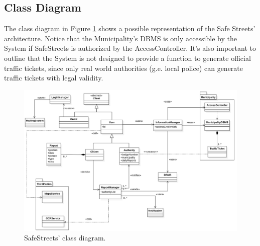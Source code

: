 \documentclass{report}
\begin{document}
\subsection{Class Diagram}
The class diagram in Figure \ref{fig:UML} shows a possible representation of the Safe Streets' architecture. Notice that the Municipality's DBMS is only accessible by the System if SafeStreets is authorized by the AccessController. It's also important to outline that the System is not designed to provide a function to generate official traffic tickets, since only real world authorities (g.e. local police) can generate traffic tickets with legal validity.
\begin{figure}[!ht]
\begin{center}
\includegraphics[width=\textwidth]{./img/SWE1.png}
\end{center}
\caption{SafeStreets' class diagram.}
\label{fig:UML}
\end{figure} 
\newpage
\end{document}
